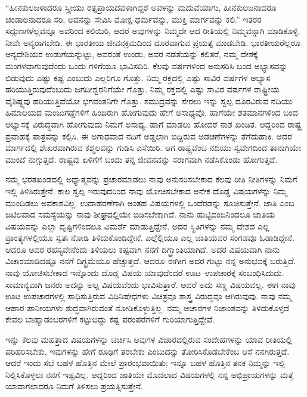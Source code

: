“ಹೀನಕುಲಜಳಾದರೂ ಸ್ತ್ರೀಯು ರತ್ನಪ್ರಾಯದವಳಾಗಿದ್ದರೆ ಅವಳನ್ನು ಮದುವೆಯಾಗು, ಹೀನಕುಲಜನಾದರೂ ಚಂಡಾಲನಾದರೂ ಸರಿ, ಅವನನ್ನು ಸೇವಿಸಿ ಮೋಕ್ಷ ಧರ್ಮವನ್ನು, ಮುಕ್ತಿ ಮಾರ್ಗವನ್ನು ಕಲಿ.” ಇತರರ ಸದ್ಗುಣಗಳೆಲ್ಲವನ್ನೂ ಅವರಿಂದ ಕಲಿಯಿರಿ, ಆದರೆ ಅವುಗಳನ್ನು ನಿಮ್ಮದೇ ಆದ ರೀತಿಯಲ್ಲಿ ನಿಮ್ಮವನ್ನಾಗಿ ಮಾಡಿಕೊಳ್ಳಿ. ನೀವೇ ಅನ್ಯರಾಗಬೇಡಿ. ಈ ಭಾರತೀಯ ಜೀವನಕ್ರಮದಿಂದ ದೂರವಾಗುವ ಪ್ರಯತ್ನ ಮಾಡಬೇಡಿ. ಭಾರತೀಯರೆಲ್ಲರೂ ಅನ್ಯದೇಶಿಯರ ಉಡುಗೆಯನ್ನುಟ್ಟು, ಅವರಂತೆ ಉಂಡು, ಅವರ ನಡತೆಯನ್ನು ಕಲಿತರೆ, ನಮ್ಮ ದೇಶಕ್ಕೆ ಮಂಗಳವಾಗುವುದೆಂದು ಒಂದು ಗಳಿಗೆಯೂ ಭಾವಿಸದಿರಿ. ಕೆಲವು ವರ್ಷಗಳಿಂದ ಅನುಸರಿಸಿ ಬಂದ ಅಭ್ಯಾಸವನ್ನು ಬಿಡುವುದು ಎಷ್ಟು ಕಷ್ಟ ಎಂಬುದು ಎಲ್ಲರಿಗೂ ಗೊತ್ತು. ನಿಮ್ಮ ರಕ್ತದಲ್ಲಿ ಎಷ್ಟು ಸಾವಿರ ವರ್ಷಗಳ ಅಭ್ಯಾಸ ಹರಿಯುತ್ತಿರುವುದೆಂಬುದು ಜಗದೀಶ್ವರನಿಗೆಯೇ ಗೊತ್ತು. ನಿಮ್ಮ ರಕ್ತದಲ್ಲಿ ಎಷ್ಟು ಸಾವಿರ ವರ್ಷಗಳ ರಾಷ್ಟ್ರೀಯ ವೈಶಿಷ್ಟ್ಯವು ಹರಿಯುತ್ತಿವೆಯೋ ಭಗವಂತನಿಗೇ ಗೊತ್ತು. ಸಮುದ್ರವನ್ನು ಸೇರಲು ಇನ್ನು ಸ್ವಲ್ಪ ದೂರವಿರುವ ನದಿಯು ಹಿಮಾಲಯದ ಮಂಜುಗಡ್ಡೆಗಳಿಗೆ ಹಿಂದಿರುಗಿ ಹೋಗುವುದು ಹೇಗೆ ಅಸಾಧ್ಯವೊ, ಹಾಗೆಯೇ ಶತಮಾನಗಳಿಂದ ಬಂದ ಅಭ್ಯಾಸಕ್ಕೆ ವಿರುದ್ಧವಾಗಿ ಹೋಗುವುದು ನಿಮಗೆ ಅಸಾಧ್ಯ. ಹಾಗೆ ಮಾಡಲು ಹೋದರೆ ನಾಶ ಖಂಡಿತ. ಆದ್ದರಿಂದ ರಾಷ್ಟ್ರ ಪ್ರವಾಹಕ್ಕೆ ಪಾತ್ರವನ್ನು ಕಲ್ಪಿಸಿ. ಈ ಅಗಾಧವಾದ ನದಿಗೆ ಅಡ್ಡಲಾಗಿ ಬಿದ್ದಿರುವ ಅಡಚಣೆಗಳನ್ನು ತೆಗೆದುಹಾಕಿ. ಅದರ ಮಾರ್ಗದಲ್ಲಿ ಶೇಖರವಾಗಿರುವ ಕಶ್ಮಲವನ್ನು ಗುಡಿಸಿ ಎಸೆಯಿರಿ. ಆಗ ರಾಷ್ಟ್ರವೆಂಬ ನದಿಯು ಸ್ವವೇಗದಿಂದ ತಾನಾಗಿಯೇ ಮುಂದೆ ನುಗ್ಗುತ್ತದೆ. ರಾಷ್ಟ್ರವು ಏಳಿಗೆಗೆ ಬಂದು ತನ್ನ ಜೀವನವನ್ನು ಸರಾಗವಾಗಿ ನಡೆಸಿಕೊಂಡು ಹೋಗುತ್ತದೆ.

\vskip 2pt

ನಮ್ಮ ಭರತಖಂಡದಲ್ಲಿ ಅಧ್ಯಾತ್ಮವನ್ನು ಪ್ರಚಾರಮಾಡಲು ನಾವು ಅನುಸರಿಸಬೇಕಾದ ಕೆಲವು ರೀತಿ ನೀತಿಗಳನ್ನು ನಿಮಗೆ ಇಲ್ಲಿ ತಿಳಿಸಿರುತ್ತೇನೆ. ಕಾಲ ಸ್ವಲ್ಪ ಇರುವುದರಿಂದ ನಾವು ಯೋಚಿಸಬೇಕಾದ ಅನೇಕ ದೊಡ್ಡ ವಿಷಯಗಳನ್ನು ನಿಮ್ಮ ಮುಂದಿಡಲು ಅವಕಾಶವಿಲ್ಲ. ಉದಾಹರಣೆಗಾಗಿ ಅಂತಹ ವಿಷಯಗಳಲ್ಲಿ ಒಂದೆರಡನ್ನು ಸೂಚಿಸುತ್ತೇನೆ. ಜಾತಿ ಎಂಬ ಜಟಿಲವಾದ ಸಮಸ್ಯೆಯನ್ನು ನಾವು ಶೀಘ್ರದಲ್ಲಿಯೇ ಬಿಡಿಸಬೇಕಾಗಿದೆ. ನಾನು ಹುಟ್ಟಿದಂದಿನಿಂದಲೂ ಜಾತಿಯ ವಿಷಯವನ್ನು ಎಲ್ಲಾ ದೃಷ್ಟಿಗಳಿಂದಲೂ ವಿಮರ್ಶೆ ಮಾಡುತ್ತಿದ್ದೇನೆ. ಅದರ ಸ್ಥಿತಿಗಳನ್ನು ನಮ್ಮ ದೇಶದ ಎಲ್ಲ ಪ್ರಾಂತ್ಯಗಳಲ್ಲಿಯೂ ಸ್ವತಃ ನೋಡಿ ತಿಳಿದುಕೊಂಡಿದ್ದೇನೆ. ಎಲ್ಲೆಲ್ಲಿಯೂ ಎಲ್ಲ ಜಾತಿಯವರ ಸಂಗಡವೂ ಓಡಾಡಿದ್ದೇನೆ. ಆದರೂ ಅದರ ರಹಸ್ಯವೇನೆಂದು ತಿಳಿಯಲು ಕಷ್ಟವಾಗಿ ನನಗೆ ದಿಗ್ಭ್ರಾಂತಿಯಾಗಿದೆ. ಅದರ ವಿಷಯವಾಗಿ ನಾನು ವಿಚಾರಮಾಡಿದಷ್ಟೂ ನನಗೆ ದಿಗ್ಭ್ರಮೆಯೂ ಹೆಚ್ಚುತ್ತದೆ. ಆದರೂ ಈಗೀಗ ಅದರ ಗುಟ್ಟು ನನ್ನ ಅನುಭವಕ್ಕೆ ಬರುತ್ತಿದೆ. ನಾವು ಯೋಚಿಸಬೇಕಾದ ಇನ್ನೊಂದು ದೊಡ್ಡ ವಿಷಯ ಯಾವುದೆಂದರೆ ಊಟ–ಉಪಚಾರಕ್ಕೆ ಸಂಬಂಧಿಸಿದುದು. ಸಾಮಾನ್ಯವಾಗಿ ಜನರು ಅದನ್ನು ಅಲ್ಪ ವಿಷಯವೆಂದು ಭಾವಿಸುತ್ತಾರೆ. ಆದರೆ ಅದು ಸಣ್ಣ ವಿಷಯವಲ್ಲ. ಈಗ ನಾವು ಊಟ ಉಪಚಾರಗಳಲ್ಲಿ ಸಾಧಿಸುತ್ತಿರುವ ವಿಧಿನಿಷೇಧಗಳು ವಿಚಿತ್ರವೂ ಶಾಸ್ತ್ರ ವಿರುದ್ಧವೂ ಆಗಿರುವುವು. ನಾವು ನಮ್ಮ ಆಹಾರ ಪಾನೀಯಗಳು ಶುದ್ಧವಾಗಿರುವಂತೆ ನೋಡಿಕೊಳ್ಳುತ್ತಿಲ್ಲ. ನಮ್ಮ ಆಚಾರಗಳ ನಿಜಾಂಶವನ್ನು ತಿಳಿದುಕೊಳ್ಳದೆ ಕೇವಲ ಬಾಹ್ಯಾಡಂಬರಗಳಿಗೆ ಕಟ್ಟುಬಿದ್ದು ಕಷ್ಟ ಪರಂಪರೆಗಳಿಗೆ ಗುರಿಯಾಗುತ್ತಿದ್ದೇವೆ.

\vskip 2pt

ಇನ್ನು ಕೆಲವು ಮಹತ್ತಾದ ವಿಷಯಗಳನ್ನು ಚರ್ಚಿಸಿ ಅವುಗಳ ವಿಚಾರದಲ್ಲಿರುವ ಸಂದೇಹಗಳನ್ನು ಯಾವ ರೀತಿಯಲ್ಲಿ ಪರಿಹರಿಸಬೇಕು, ಇವುಗಳನ್ನು ಹೇಗೆ ರೂಢಿಗೆ ತರಬೇಕು ಎಂಬುದನ್ನು ತೋರಿಸಿಕೊಡಬೇಕೆಂಬ ಆಸೆ ನನಗಿರುತ್ತದೆ. ಆದರೆ ಇಂದು ಸಭೆ ಬಹಳ ಹೊತ್ತಿನ ಮೇಲೆ ಪ್ರಾರಂಭವಾಯಿತು; ಇನ್ನೂ ಬಹಳ ಹೊತ್ತಿನ ತನಕ ನಿಮ್ಮನ್ನು ಇಲ್ಲಿ ನಿಲ್ಲಿಸಿಕೊಳ್ಳಲು ನನಗೆ ಇಷ್ಟವಿಲ್ಲ. ಆದ್ದರಿಂದ ಜಾತಿಯೇ ಮೊದಲಾದ ವಿಷಯಗಳಲ್ಲಿ ನನ್ನ ಅಭಿಪ್ರಾಯಗಳನ್ನು ಮತ್ತೆ ಯಾವಾಗಲಾದರೂ ನಿಮಗೆ ತಿಳಿಸಲು ಪ್ರಯತ್ನಿಸುತ್ತೇನೆ.

